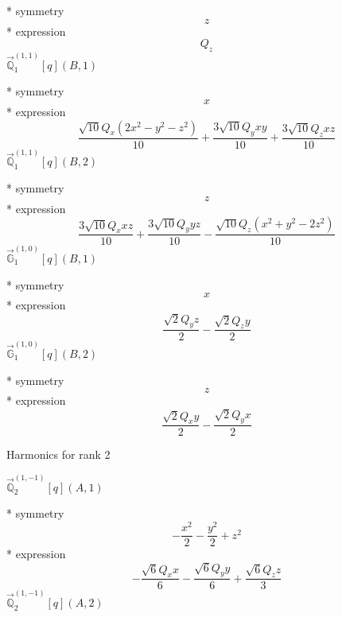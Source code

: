 \documentclass[fleqn,8pt]{jsarticle}
\begin{document}
\noindent\quad ** symmetry
\begin{dmath*}
z
\end{dmath*}
\noindent\quad ** expression
\begin{dmath*}
Q_{z}
\end{dmath*}
\noindent\quad $\vec{\mathbb{Q}}_{1}^{(1,1)}[q](B,1)$

\noindent\quad ** symmetry
\begin{dmath*}
x
\end{dmath*}
\noindent\quad ** expression
\begin{dmath*}
\frac{\sqrt{10} Q_{x} \left(2 x^{2} - y^{2} - z^{2}\right)}{10} + \frac{3 \sqrt{10} Q_{y} x y}{10} + \frac{3 \sqrt{10} Q_{z} x z}{10}
\end{dmath*}
\noindent\quad $\vec{\mathbb{Q}}_{1}^{(1,1)}[q](B,2)$

\noindent\quad ** symmetry
\begin{dmath*}
z
\end{dmath*}
\noindent\quad ** expression
\begin{dmath*}
\frac{3 \sqrt{10} Q_{x} x z}{10} + \frac{3 \sqrt{10} Q_{y} y z}{10} - \frac{\sqrt{10} Q_{z} \left(x^{2} + y^{2} - 2 z^{2}\right)}{10}
\end{dmath*}
\noindent\quad $\vec{\mathbb{G}}_{1}^{(1,0)}[q](B,1)$

\noindent\quad ** symmetry
\begin{dmath*}
x
\end{dmath*}
\noindent\quad ** expression
\begin{dmath*}
\frac{\sqrt{2} Q_{y} z}{2} - \frac{\sqrt{2} Q_{z} y}{2}
\end{dmath*}
\noindent\quad $\vec{\mathbb{G}}_{1}^{(1,0)}[q](B,2)$

\noindent\quad ** symmetry
\begin{dmath*}
z
\end{dmath*}
\noindent\quad ** expression
\begin{dmath*}
\frac{\sqrt{2} Q_{x} y}{2} - \frac{\sqrt{2} Q_{y} x}{2}
\end{dmath*}

\noindent * Harmonics for rank 2

\noindent\quad $\vec{\mathbb{Q}}_{2}^{(1,-1)}[q](A,1)$

\noindent\quad ** symmetry
\begin{dmath*}
- \frac{x^{2}}{2} - \frac{y^{2}}{2} + z^{2}
\end{dmath*}
\noindent\quad ** expression
\begin{dmath*}
- \frac{\sqrt{6} Q_{x} x}{6} - \frac{\sqrt{6} Q_{y} y}{6} + \frac{\sqrt{6} Q_{z} z}{3}
\end{dmath*}
\noindent\quad $\vec{\mathbb{Q}}_{2}^{(1,-1)}[q](A,2)$
\end{document}
